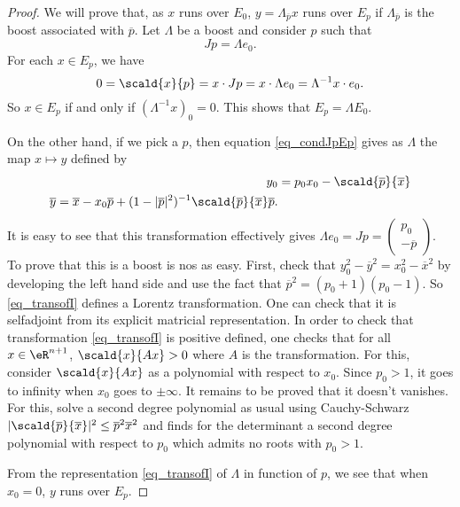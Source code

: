\begin{proof}
We will prove that, as $x$ runs over $E_0$, $y=\Lambda_{\overline{p}}x$ runs over $E_p$ if $\Lambda_{\overline{p}}$ is the boost associated with $\overline{p}$. Let $\Lambda$ be a boost and consider $p$ such that 
\begin{equation}  \label{eq_condJpEp}
Jp=\Lambda e_0.
\end{equation}
For each $x\in E_p$, we have
\[ 
  0=\scald{ x }{ p }=x\cdot Jp=x\cdot\Lambda e_0=\Lambda^{-1}x\cdot e_0.
\]
So $x\in E_p$ if and only if $(\Lambda^{-1}x)_0=0$. This shows that $E_p=\Lambda E_0$.

On the other hand, if we pick a $p$, then equation \eqref{eq_condJpEp} gives as $\Lambda$ the map $x\mapsto y$ defined by
 \begin{subequations} \label{eq_transofI}
\begin{align}
  y_0&=p_0x_0-\scald{ \overline{p} }{ \overline{x} }\\
\overline{ y }=\overline{x}-x_0\overline{p}+(1-|\overline{p}|^2)^{-1}\scald{ \overline{p} }{ \overline{x} }\overline{p}.
\end{align}
\end{subequations}
It is easy to see that this transformation effectively gives $\Lambda e_0=Jp=
\begin{pmatrix}
p_0\\-\overline{p}
\end{pmatrix}
$. To prove that this is a boost is nos as easy. First, check that $y_0^2-\overline{ y }^2=x_0^2-\overline{x}^2$ by developing the left hand side and use the fact that $\overline{p}^2=(p_0+1)(p_0-1)$. So \eqref{eq_transofI} defines a Lorentz transformation. One can check that it is selfadjoint from its explicit matricial representation. In order to check that transformation \eqref{eq_transofI} is positive defined, one checks that for all $x\in\eR^{n+1}$,  $\scald{ x }{ Ax }>0$ where $A$ is the transformation. For this, consider $\scald{ x }{ Ax }$ as a polynomial with respect to $x_0$. Since $p_0>1$, it goes to infinity when $x_0$ goes to $\pm\infty$. It remains to be proved that it doesn't vanishes. For this, solve a second degree polynomial as usual using Cauchy-Schwarz $| \scald{ \overline{p} }{ \overline{x} } |^2\leq \overline{p}^2\overline{x}^2$ and finds for the determinant a second degree polynomial with respect to $p_0$ which admits no roots with $p_0>1$.

From the representation \eqref{eq_transofI} of $\Lambda$ in function of $p$, we see that when $x_0=0$, $y$ runs over $E_p$.  

\end{proof}

